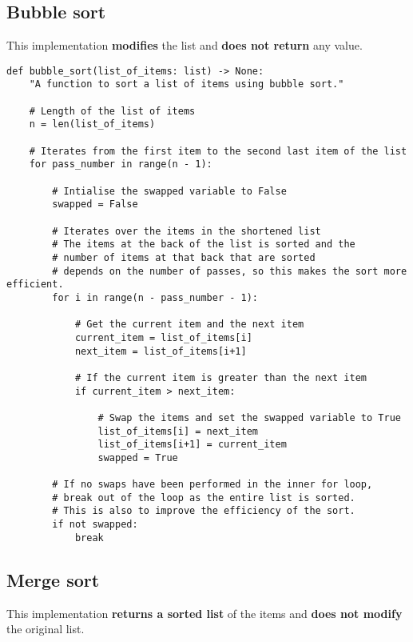 \documentclass[11pt]{article}
\begin{document}
\subsection{Bubble sort}
\label{sec:org2233bef}
This implementation \textbf{modifies} the list and \textbf{does not return} any value.
\begin{verbatim}
def bubble_sort(list_of_items: list) -> None:
    "A function to sort a list of items using bubble sort."

    # Length of the list of items
    n = len(list_of_items)

    # Iterates from the first item to the second last item of the list
    for pass_number in range(n - 1):

        # Intialise the swapped variable to False
        swapped = False

        # Iterates over the items in the shortened list
        # The items at the back of the list is sorted and the
        # number of items at that back that are sorted
        # depends on the number of passes, so this makes the sort more efficient.
        for i in range(n - pass_number - 1):

            # Get the current item and the next item
            current_item = list_of_items[i]
            next_item = list_of_items[i+1]

            # If the current item is greater than the next item
            if current_item > next_item:

                # Swap the items and set the swapped variable to True
                list_of_items[i] = next_item
                list_of_items[i+1] = current_item
                swapped = True

        # If no swaps have been performed in the inner for loop,
        # break out of the loop as the entire list is sorted.
        # This is also to improve the efficiency of the sort.
        if not swapped:
            break
\end{verbatim}

\subsection{Merge sort}
\label{sec:orgde06c20}
This implementation \textbf{returns a sorted list} of the items and \textbf{does not modify} the original list.
\end{document}
